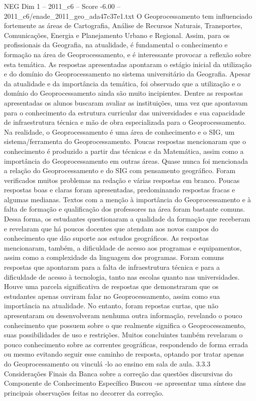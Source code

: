 \begin{textsample}{NEG Dim 1 – 2011\_c6 – Score -6.00 – 2011\_c6/enade\_2011\_geo\_ada47c37e1.txt}
O Geoprocessamento tem influenciado fortemente as áreas de Cartografia, Análise de Recursos Naturais, Transportes, Comunicações, Energia e Planejamento Urbano e Regional.
Assim, para os profissionais da Geografia, na atualidade, é fundamental o conhecimento e formação na área de Geoprocessamento, e é interessante provocar a reflexão sobre esta temática.
As respostas apresentadas apontaram o estágio inicial da utilização e do domínio do Geoprocessamento no sistema universitário da Geografia.
Apesar da atualidade e da importância da temática, foi observado que a utilização e o domínio do Geoprocessamento ainda são muito incipientes.
Dentre as respostas apresentadas os alunos buscaram avaliar as instituições, uma vez que apontavam para o conhecimento da estrutura curricular das universidades e sua capacidade de infraestrutura técnica e mão de obra especializada para o Geoprocessamento.
Na realidade, o Geoprocessamento é uma área de conhecimento e o SIG, um sistema/ferramenta do Geoprocessamento.
Poucas respostas mencionaram que o conhecimento é produzido a partir das técnicas e da Matemática, assim como a importância do Geoprocessamento em outras áreas.
Quase nunca foi mencionada a relação do Geoprocessamento e do SIG com pensamento geográfico.
Foram verificados muitos problemas na redação e várias respostas em branco.
Poucas respostas boas e claras foram apresentadas, predominando respostas fracas e algumas medianas.
Textos com a menção à importância do Geoprocessamento e à falta de formação e qualificação dos professores na área foram bastante comuns.
Dessa forma, os estudantes questionaram a qualidade da formação que receberam e revelaram que há poucos docentes que atendam aos novos campos do conhecimento que dão suporte aos estudos geográficos.
As respostas mencionaram, também, a dificuldade de acesso aos programas e equipamentos, assim como a complexidade da linguagem dos programas.
Foram comuns respostas que apontaram para a falta de infraestrutura técnica e para a dificuldade de acesso à tecnologia, tanto nas escolas quanto nas universidades.
Houve uma parcela significativa de respostas que demonstraram que os estudantes apenas ouviram falar no Geoprocessamento, assim como sua importância na atualidade.
No entanto, foram repostas curtas, que não apresentaram ou desenvolveram nenhuma outra informação, revelando o pouco conhecimento que possuem sobre o que realmente significa o Geoprocessamento, suas possibilidades de uso e restrições.
Muitos concluintes também revelaram o pouco conhecimento sobre as correntes geográficas, respondendo de forma errada ou mesmo evitando seguir esse caminho de resposta, optando por tratar apenas do Geoprocessamento ou vinculá -lo ao ensino em sala de aula. 3.3.3 Considerações Finais da Banca sobre a correção das questões discursivas do Componente de Conhecimento Específico Buscou -se apresentar uma síntese das principais observações feitas no decorrer da correção.

\end{textsample}

